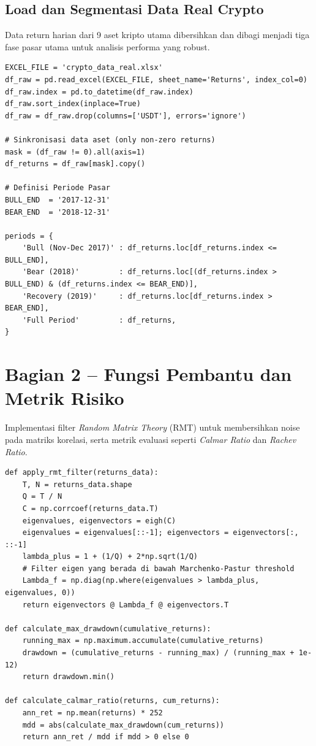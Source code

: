\documentclass[12pt,a4paper]{article}
\begin{document}
\subsection{Load dan Segmentasi Data Real Crypto}
Data return harian dari 9 aset kripto utama dibersihkan dan dibagi menjadi tiga fase pasar utama untuk analisis performa yang robust.
\begin{lstlisting}[caption={Preparasi dataset dan sub-periode}]
EXCEL_FILE = 'crypto_data_real.xlsx'
df_raw = pd.read_excel(EXCEL_FILE, sheet_name='Returns', index_col=0)
df_raw.index = pd.to_datetime(df_raw.index)
df_raw.sort_index(inplace=True)
df_raw = df_raw.drop(columns=['USDT'], errors='ignore')

# Sinkronisasi data aset (only non-zero returns)
mask = (df_raw != 0).all(axis=1)
df_returns = df_raw[mask].copy()

# Definisi Periode Pasar
BULL_END  = '2017-12-31'
BEAR_END  = '2018-12-31'

periods = {
    'Bull (Nov-Dec 2017)' : df_returns.loc[df_returns.index <= BULL_END],
    'Bear (2018)'         : df_returns.loc[(df_returns.index > BULL_END) & (df_returns.index <= BEAR_END)],
    'Recovery (2019)'     : df_returns.loc[df_returns.index > BEAR_END],
    'Full Period'         : df_returns,
}
\end{lstlisting}

\section{Bagian 2 -- Fungsi Pembantu dan Metrik Risiko}
Implementasi filter \textit{Random Matrix Theory} (RMT) untuk membersihkan noise pada matriks korelasi, serta metrik evaluasi seperti \textit{Calmar Ratio} dan \textit{Rachev Ratio}.

\begin{lstlisting}[caption={Utility functions dan risk analytics}]
def apply_rmt_filter(returns_data):
    T, N = returns_data.shape
    Q = T / N
    C = np.corrcoef(returns_data.T)
    eigenvalues, eigenvectors = eigh(C)
    eigenvalues = eigenvalues[::-1]; eigenvectors = eigenvectors[:, ::-1]
    lambda_plus = 1 + (1/Q) + 2*np.sqrt(1/Q)
    # Filter eigen yang berada di bawah Marchenko-Pastur threshold
    Lambda_f = np.diag(np.where(eigenvalues > lambda_plus, eigenvalues, 0))
    return eigenvectors @ Lambda_f @ eigenvectors.T

def calculate_max_drawdown(cumulative_returns):
    running_max = np.maximum.accumulate(cumulative_returns)
    drawdown = (cumulative_returns - running_max) / (running_max + 1e-12)
    return drawdown.min()

def calculate_calmar_ratio(returns, cum_returns):
    ann_ret = np.mean(returns) * 252
    mdd = abs(calculate_max_drawdown(cum_returns))
    return ann_ret / mdd if mdd > 0 else 0
\end{lstlisting}
\end{document}
